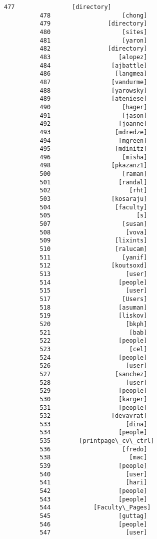 \documentclass[11pt]{article}
\begin{document}
\begin{Verbatim}[commandchars=\\\{\}]
          477                [directory]
          478                    [chong]
          479                [directory]
          480                    [sites]
          481                    [yaron]
          482                [directory]
          483                   [alopez]
          484                 [ajbattle]
          486                  [langmea]
          487                 [vandurme]
          488                 [yarowsky]
          489                 [ateniese]
          490                    [hager]
          491                    [jason]
          492                   [joanne]
          493                  [mdredze]
          494                   [mgreen]
          495                  [mdinitz]
          496                    [misha]
          498                 [pkazanz1]
          500                    [raman]
          501                   [randal]
          502                      [rht]
          503                 [kosaraju]
          504                  [faculty]
          505                        [s]
          507                    [susan]
          508                     [vova]
          509                  [lixints]
          510                  [ralucam]
          511                    [yanif]
          512                 [koutsoxd]
          513                     [user]
          514                   [people]
          515                     [user]
          517                    [Users]
          518                   [asuman]
          519                   [liskov]
          520                     [bkph]
          521                      [bab]
          522                   [people]
          523                      [cel]
          524                   [people]
          526                     [user]
          527                  [sanchez]
          528                     [user]
          529                   [people]
          530                   [karger]
          531                   [people]
          532                 [devavrat]
          533                     [dina]
          534                   [people]
          535        [printpage\_cv\_ctrl]
          536                    [fredo]
          538                      [mac]
          539                   [people]
          540                     [user]
          541                     [hari]
          542                   [people]
          543                   [people]
          544            [Faculty\_Pages]
          545                   [guttag]
          546                   [people]
          547                     [user]

\end{Verbatim}
\end{document}
